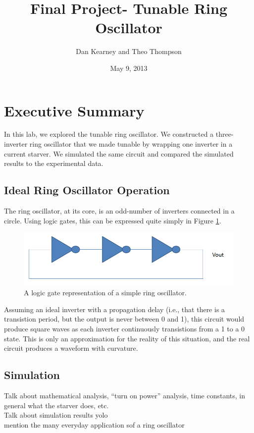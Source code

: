 \documentclass{article}
\title{Final Project- Tunable Ring Oscillator}
\author{Dan Kearney and Theo Thompson}
\date{May 9, 2013}
\begin{document}
\maketitle

\section*{Executive Summary}

In this lab, we explored the tunable ring oscillator.  We constructed a three-inverter ring oscillator that we made tunable by wrapping one inverter in a current starver.  We simulated the same circuit and compared the simulated results to the experimental data.

\subsection*{Ideal Ring Oscillator Operation}

The ring oscillator, at its core, is an odd-number of inverters connected in a circle.  Using logic gates, this can be expressed quite simply in Figure \ref{simpleSchem}.

\begin{figure}[H]
\centering
\includegraphics[scale=.6]{simpleSchem.png}
\caption{A logic gate representation of a simple ring oscillator.}
\label{simpleSchem}
\end{figure}

Assuming an ideal inverter with a propagation delay (i.e., that there is a transistion period, but the output is never between 0 and 1), this circuit would produce square waves as each inverter continuously transistions from a 1 to a 0 state.  This is only an approximation for the reality of this situation, and the real circuit produces a waveform with curvature.

\subsection*{Simulation}

Talk about mathematical analysis, ``turn on power'' analysis, time constants, in general what the starver does, etc.\\
Talk about simulation results yolo\\
mention the many everyday application sof a ring oscillator
\end{document}
